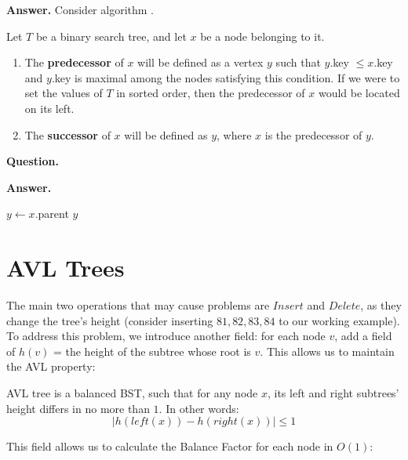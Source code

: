 \textbf{Answer.} Consider algorithm .


\begin{algorithm}
  \label{alg:search}
\SetAlgoLined
{}

\caption{Search} 
\end{algorithm}

\begin{framed}
  \begin{definition} \hfill
    Let $T$ be a binary search tree, and let $x$ be a node belonging to it. 
    \begin{enumerate}
        \item The \textbf{predecessor} of $x$ will be defined as a vertex $y$ such that $y$.key $\leq x$.key and $y$.key is maximal among the nodes satisfying this condition. If we were to set the values of $T$ in sorted order, then the predecessor of $x$ would be located on its left.
          \item The \textbf{successor} of $x$ will be defined as $y$, where $x$ is the predecessor of $y$.
    \end{enumerate}
  \end{definition}
\end{framed}


\textbf{Question.}

\textbf{Answer.}


\begin{algorithm}
\SetAlgoLined
{}
    $y \leftarrow x$.parent\;
    \Return $y$\;
\caption{Predecessor}
\end{algorithm}

\section{AVL Trees}

The main two operations that may cause problems are $Insert$ and $Delete$, as they change the tree's height (consider inserting $81,82,83,84$ to our
working example). To address this problem, we introduce another field: for each node $v$, add a field of $h(v)$ = the height of the subtree whose root is $v$. This allows us to maintain the AVL property:
\begin{framed}
  \begin{definition}
    AVL tree is a balanced BST, such that for any node $x$, its left and right subtrees' height differs in no more than $1$. In other words:
    $$|h(left(x)) - h(right(x))|\leq 1$$
  \end{definition}
    \end{framed}
    This field allows us to calculate the Balance Factor for each node in $O
    (1)$:

